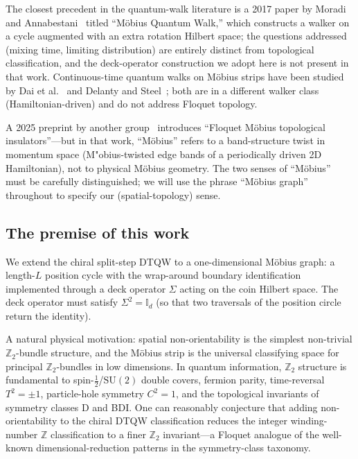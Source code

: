 \documentclass[aps,pra,reprint,amsmath,amssymb,superscriptaddress,nofootinbib,longbibliography]{revtex4-2}
\newcommand{\Z}{\mathbb{Z}}
\newcommand{\I}{\mathbb{I}}
\begin{document}
The closest precedent in the quantum-walk literature is a 2017 paper by Moradi and Annabestani~\cite{moradi2017} titled ``M\"obius Quantum Walk,'' which constructs a walker on a cycle augmented with an extra rotation Hilbert space; the questions addressed (mixing time, limiting distribution) are entirely distinct from topological classification, and the deck-operator construction we adopt here is not present in that work. Continuous-time quantum walks on M\"obius strips have been studied by Dai et al.~\cite{dai2012} and Delanty and Steel~\cite{delanty2012}; both are in a different walker class (Hamiltonian-driven) and do not address Floquet topology.

A 2025 preprint by another group~\cite{floquet_mobius_TI_2025} introduces ``Floquet M\"obius topological insulators''---but in that work, ``M\"obius'' refers to a band-structure twist in momentum space (M"obius-twisted edge bands of a periodically driven 2D Hamiltonian), not to physical M\"obius geometry. The two senses of ``M\"obius'' must be carefully distinguished; we will use the phrase ``M\"obius graph'' throughout to specify our (spatial-topology) sense.

\subsection{The premise of this work}

We extend the chiral split-step DTQW to a one-dimensional M\"obius graph: a length-$L$ position cycle with the wrap-around boundary identification implemented through a deck operator $\Sigma$ acting on the coin Hilbert space. The deck operator must satisfy $\Sigma^2 = \I_d$ (so that two traversals of the position circle return the identity).

A natural physical motivation: spatial non-orientability is the simplest non-trivial $\Z_2$-bundle structure, and the M\"obius strip is the universal classifying space for principal $\Z_2$-bundles in low dimensions. In quantum information, $\Z_2$ structure is fundamental to spin-$\tfrac{1}{2}$/$\mathrm{SU}(2)$ double covers, fermion parity, time-reversal $T^2 = \pm 1$, particle-hole symmetry $C^2 = 1$, and the topological invariants of symmetry classes D and BDI. One can reasonably conjecture that adding non-orientability to the chiral DTQW classification reduces the integer winding-number $\Z$ classification to a finer $\Z_2$ invariant---a Floquet analogue of the well-known dimensional-reduction patterns in the symmetry-class taxonomy.
\end{document}
